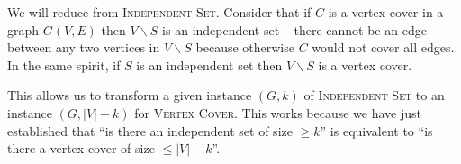 \documentclass{article}
\begin{document}
We will reduce from \textsc{Independent Set}. Consider that if $C$ is a vertex cover in a graph $G(V, E)$ then $V \backslash S$ is an independent set -- there cannot be an edge between any two vertices in $V \backslash S$ because otherwise $C$ would not cover all edges. In the same spirit, if $S$ is an independent set then $V \backslash S$ is a vertex cover.

This allows us to transform a given instance $(G, k)$ of \textsc{Independent Set} to an instance $(G, |V| - k)$ for \textsc{Vertex Cover}. This works because we have just established that \enquote{is there an independent set of size $\geq k$} is equivalent to \enquote{is there a vertex cover of size $\leq |V| - k$}.
\end{document}
